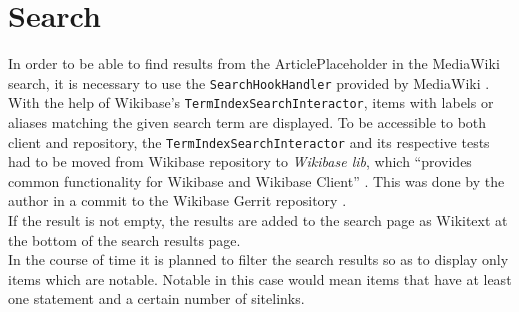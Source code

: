 \section{Search}
In order to be able to find results from the ArticlePlaceholder in the MediaWiki search, it is necessary to use the \texttt{\justify SearchHookHandler} provided by MediaWiki \citep{wiki:25}. \\
With the help of Wikibase's \texttt{\justify TermIndexSearchInteractor}, items with labels or aliases matching the given search term are displayed. To be accessible to both client and repository, the \texttt{\justify TermIndexSearchInteractor} and its respective tests had to be moved from Wikibase repository to \textit{Wikibase lib}, which ``provides common functionality for Wikibase and Wikibase Client'' \citep{wiki:28}. This was done by the author in a commit to the Wikibase Gerrit repository \citep{gerrit:01}.
\\
If the result is not empty, the results are added to the search page as Wikitext at the bottom of the search results page. \\
In the course of time it is planned to filter the search results so as to display only items which are notable. Notable in this case would mean items that have at least one statement and a certain number of sitelinks.
